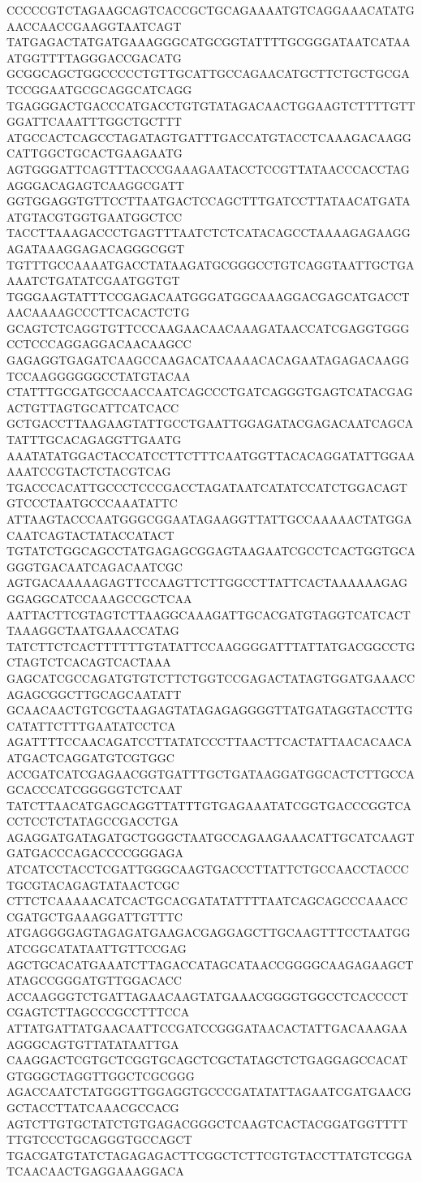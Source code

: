 CCCCCGTCTAGAAGCAGTCACCGCTGCAGAAAATGTCAGGAAACATATGAACCAACCGAAGGTAATCAGT
TATGAGACTATGATGAAAGGGCATGCGGTATTTTGCGGGATAATCATAAATGGTTTTAGGGACCGACATG
GCGGCAGCTGGCCCCCTGTTGCATTGCCAGAACATGCTTCTGCTGCGATCCGGAATGCGCAGGCATCAGG
TGAGGGACTGACCCATGACCTGTGTATAGACAACTGGAAGTCTTTTGTTGGATTCAAATTTGGCTGCTTT
ATGCCACTCAGCCTAGATAGTGATTTGACCATGTACCTCAAAGACAAGGCATTGGCTGCACTGAAGAATG
AGTGGGATTCAGTTTACCCGAAAGAATACCTCCGTTATAACCCACCTAGAGGGACAGAGTCAAGGCGATT
GGTGGAGGTGTTCCTTAATGACTCCAGCTTTGATCCTTATAACATGATAATGTACGTGGTGAATGGCTCC
TACCTTAAAGACCCTGAGTTTAATCTCTCATACAGCCTAAAAGAGAAGGAGATAAAGGAGACAGGGCGGT
TGTTTGCCAAAATGACCTATAAGATGCGGGCCTGTCAGGTAATTGCTGAAAATCTGATATCGAATGGTGT
TGGGAAGTATTTCCGAGACAATGGGATGGCAAAGGACGAGCATGACCTAACAAAAGCCCTTCACACTCTG
GCAGTCTCAGGTGTTCCCAAGAACAACAAAGATAACCATCGAGGTGGGCCTCCCAGGAGGACAACAAGCC
GAGAGGTGAGATCAAGCCAAGACATCAAAACACAGAATAGAGACAAGGTCCAAGGGGGGCCTATGTACAA
CTATTTGCGATGCCAACCAATCAGCCCTGATCAGGGTGAGTCATACGAGACTGTTAGTGCATTCATCACC
GCTGACCTTAAGAAGTATTGCCTGAATTGGAGATACGAGACAATCAGCATATTTGCACAGAGGTTGAATG
AAATATATGGACTACCATCCTTCTTTCAATGGTTACACAGGATATTGGAAAAATCCGTACTCTACGTCAG
TGACCCACATTGCCCTCCCGACCTAGATAATCATATCCATCTGGACAGTGTCCCTAATGCCCAAATATTC
ATTAAGTACCCAATGGGCGGAATAGAAGGTTATTGCCAAAAACTATGGACAATCAGTACTATACCATACT
TGTATCTGGCAGCCTATGAGAGCGGAGTAAGAATCGCCTCACTGGTGCAGGGTGACAATCAGACAATCGC
AGTGACAAAAAGAGTTCCAAGTTCTTGGCCTTATTCACTAAAAAAGAGGGAGGCATCCAAAGCCGCTCAA
AATTACTTCGTAGTCTTAAGGCAAAGATTGCACGATGTAGGTCATCACTTAAAGGCTAATGAAACCATAG
TATCTTCTCACTTTTTTGTATATTCCAAGGGGATTTATTATGACGGCCTGCTAGTCTCACAGTCACTAAA
GAGCATCGCCAGATGTGTCTTCTGGTCCGAGACTATAGTGGATGAAACCAGAGCGGCTTGCAGCAATATT
GCAACAACTGTCGCTAAGAGTATAGAGAGGGGTTATGATAGGTACCTTGCATATTCTTTGAATATCCTCA
AGATTTTCCAACAGATCCTTATATCCCTTAACTTCACTATTAACACAACAATGACTCAGGATGTCGTGGC
ACCGATCATCGAGAACGGTGATTTGCTGATAAGGATGGCACTCTTGCCAGCACCCATCGGGGGTCTCAAT
TATCTTAACATGAGCAGGTTATTTGTGAGAAATATCGGTGACCCGGTCACCTCCTCTATAGCCGACCTGA
AGAGGATGATAGATGCTGGGCTAATGCCAGAAGAAACATTGCATCAAGTGATGACCCAGACCCCGGGAGA
ATCATCCTACCTCGATTGGGCAAGTGACCCTTATTCTGCCAACCTACCCTGCGTACAGAGTATAACTCGC
CTTCTCAAAAACATCACTGCACGATATATTTTAATCAGCAGCCCAAACCCGATGCTGAAAGGATTGTTTC
ATGAGGGGAGTAGAGATGAAGACGAGGAGCTTGCAAGTTTCCTAATGGATCGGCATATAATTGTTCCGAG
AGCTGCACATGAAATCTTAGACCATAGCATAACCGGGGCAAGAGAAGCTATAGCCGGGATGTTGGACACC
ACCAAGGGTCTGATTAGAACAAGTATGAAACGGGGTGGCCTCACCCCTCGAGTCTTAGCCCGCCTTTCCA
ATTATGATTATGAACAATTCCGATCCGGGATAACACTATTGACAAAGAAAGGGCAGTGTTATATAATTGA
CAAGGACTCGTGCTCGGTGCAGCTCGCTATAGCTCTGAGGAGCCACATGTGGGCTAGGTTGGCTCGCGGG
AGACCAATCTATGGGTTGGAGGTGCCCGATATATTAGAATCGATGAACGGCTACCTTATCAAACGCCACG
AGTCTTGTGCTATCTGTGAGACGGGCTCAAGTCACTACGGATGGTTTTTTGTCCCTGCAGGGTGCCAGCT
TGACGATGTATCTAGAGAGACTTCGGCTCTTCGTGTACCTTATGTCGGATCAACAACTGAGGAAAGGACA
